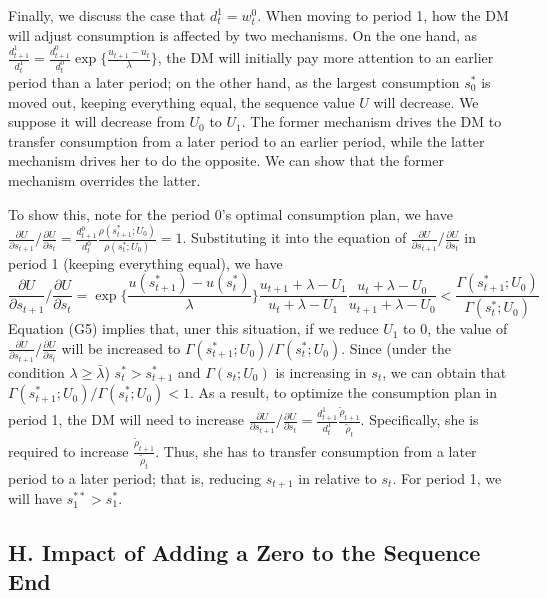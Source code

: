 \documentclass[
  12pt,
]{article}
\begin{document}
Finally, we discuss the case that \(d_t^1=w_t^0\). When moving to period
1, how the DM will adjust consumption is affected by two mechanisms. On
the one hand, as
\(\frac{d_{t+1}^1}{d_t^1}=\frac{d_{t+1}^0}{d_t^0}\exp\{\frac{u_{t+1}-u_t}{\lambda}\}\),
the DM will initially pay more attention to an earlier period than a
later period; on the other hand, as the largest consumption \(s_0^*\) is
moved out, keeping everything equal, the sequence value \(U\) will
decrease. We suppose it will decrease from \(U_0\) to \(U_1\). The
former mechanism drives the DM to transfer consumption from a later
period to an earlier period, while the latter mechanism drives her to do
the opposite. We can show that the former mechanism overrides the
latter.

To show this, note for the period 0's optimal consumption plan, we have
\(\frac{\partial U}{\partial s_{t+1}}/\frac{\partial U}{\partial s_{t}}=\frac{d_{t+1}^0}{d_t^0}\frac{\rho(s_{t+1}^*;U_0)}{\rho(s_t^*;U_0)}=1\).
Substituting it into the equation of
\(\frac{\partial U}{\partial s_{t+1}}/\frac{\partial U}{\partial s_{t}}\)
in period 1 (keeping everything equal), we have\[
\tag{G5}
\frac{\partial U}{\partial s_{t+1}}/\frac{\partial U}{\partial s_{t}}
= \exp\{\frac{u(s_{t+1}^*)-u(s_t^*)}{\lambda}\}\frac{u_{t+1}+\lambda-U_1}{u_t+\lambda-U_1}
\frac{u_t+\lambda-U_0}{u_{t+1}+\lambda-U_0}<\frac{\Gamma(s_{t+1}^*;U_0)}{\Gamma(s_{t}^*;U_0)}
\]Equation (G5) implies that, uner this situation, if we reduce \(U_1\)
to 0, the value of
\(\frac{\partial U}{\partial s_{t+1}}/\frac{\partial U}{\partial s_{t}}\)
will be increased to \(\Gamma(s_{t+1}^*;U_0)/\Gamma(s_t^*;U_0)\). Since
(under the condition \(\lambda \geq \bar{\lambda}\)) \(s_t^*>s_{t+1}^*\)
and \(\Gamma(s_t;U_0)\) is increasing in \(s_t\), we can obtain that
\(\Gamma(s_{t+1}^*;U_0)/\Gamma(s_t^*;U_0)<1\). As a result, to optimize
the consumption plan in period 1, the DM will need to increase
\(\frac{\partial U}{\partial s_{t+1}}/\frac{\partial U}{\partial s_{t}}=\frac{d_{t+1}^1}{d_t^1}\frac{\tilde{\rho}_{t+1}}{\tilde{\rho}_t}\).
Specifically, she is required to increase
\(\frac{\tilde{\rho}_{t+1}}{\tilde{\rho}_t}\). Thus, she has to transfer
consumption from a later period to a later period; that is, reducing
\(s_{t+1}\) in relative to \(s_t\). For period 1, we will have
\(s_1^{**}>s_1^*\).

\hypertarget{h.-impact-of-adding-a-zero-to-the-sequence-end}{%
\subsection*{H. Impact of Adding a Zero to the Sequence
End}\label{h.-impact-of-adding-a-zero-to-the-sequence-end}}
\end{document}

